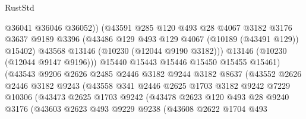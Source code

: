 \begin{lexlean}{RustStd}
\begin{coremodule}
                                @36041
                                @36046
                                @36052))
                            (@43591
                              @285
                              @120
                              @493
                              @28
                              @4067
                              @3182
                              @3176
                              @3637
                              @9189
                              @3396
                              (@43486 @129 @493 @129 @4067 (@10189 (@43491 @129)) @15402)
                              @43568
                              @13146
                              (@10230 (@12044 @9190 @3182)))
                            @13146
                            (@10230 (@12044 @9147 @9196)))
                          @15440
                          @15443
                          @15446
                          @15450
                          @15455
                          @15461)
                        (@43543
                          @9206
                          @2626
                          @2485
                          @2446
                          @3182
                          @9244
                          @3182
                          @8637
                          (@43552
                            @2626
                            @2446
                            @3182
                            @9243
                            (@43558
                              @341
                              @2446
                              @2625
                              @1703
                              @3182
                              @9242
                              @7229
                              @10306
                              (@43473
                                @2625
                                @1703
                                @9242
                                (@43478
                                  @2623
                                  @120
                                  @493
                                  @28
                                  @9240
                                  @3176
                                  (@43603
                                    @2623
                                    @493
                                    @9229
                                    @9238
                                    (@43608
                                      @2622
                                      @1704
                                      @493

\end{coremodule}
\end{lexlean}
